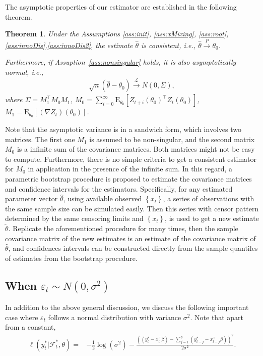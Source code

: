 \documentclass[a4paper,12pt]{article}
\newcommand{\E}{\mathop{\mathbb{E}}}
\def \trans{^\intercal}
\def \inprob {\stackrel{P}{\longrightarrow}}
\def \indist {\stackrel{\mathcal{L}}{\longrightarrow}}
\def \E{\mbox{E}}
\def \F {\mathcal{F}}
\newtheorem{theorem}{Theorem}[section]
\newenvironment{remark}[1][Remark]{\begin{trivlist}
\item[\hskip \labelsep {\bfseries #1}]}{\end{trivlist}}
\begin{document}
    The asymptotic properties of our estimator are established in the following theorem.

\begin{theorem}
Under the Assumptions \ref{ass:init}, \ref{ass:xMixing}, \ref{ass:root},\ref{ass:innoDis},\ref{ass:innoDis2}, the estimate $\hat{\theta}$ is consistent, i.e., $\hat{\theta}\inprob \theta_0$.

Furthermore, if Assuption~\ref{ass:nonsingular} holds, it is also asymptotically normal, i.e.,
\begin{align*}
\sqrt{n}\left( \hat{\theta} - \theta_0 \right)\indist N(0,\Sigma),
\end{align*}
where $\Sigma = M_1\trans M_0 M_1 $, $M_0=\sum_{i=0}^\infty \E_{\theta_0}\left[ Z_{t+i}(\theta_0)\trans Z_t(\theta_0) \right]$, $M_1 = \E_{\theta_0}\left[ (\nabla Z_t)(\theta_0) \right]$.
\label{thm:consistency}
\end{theorem}

\begin{remark}
Note that the asymptotic variance is in a sandwich form, which involves two matrices. The first one $M_1 $ is assumed to be non-singular, and the second matrix $M_0$ is a infinite sum of the covariance matrices. 
Both matrices might not be easy to compute. Furthermore, there is no simple criteria to get a
consistent estimator for $M_0$ in application in the presence of the infinite sum. 
In this regard, a parametric bootstrap procedure is proposed to estimate the covariance matrices and confidence intervals for the estimators. Specifically, for any estimated parameter vector $\hat{\theta}$, using available observed $\left\{ x_t \right\}$, a series of observations with the same sample size can be simulated easily. Then this series with censor pattern determined by the same censoring limits and $\left\{ x_t \right\}$, is used to get a new estimate $\tilde{\theta}$. Replicate the aforementioned procedure for many times, then the sample covariance matrix of the new estimates is an estimate of the covariance matrix of $\hat{\theta}$, and confidences intervals can be constructed directly from the sample quantiles of estimates from the bootstrap procedure.
\end{remark}


    \subsection{When $\varepsilon_t\sim N(0,\sigma^2)$}
    In addition to the above general discussion, we discuss the following important case where $\varepsilon_t$ follows a normal distribution with variance $\sigma^2$. Note that apart from a constant,
    \begin{align*}
	    \ell(y_t^*|\F_t^*,\theta)= &-\frac{1}{2}\log(\sigma^2) 
	    - \frac{
	    \left( (y^*_{t}-x_t\trans \beta) -\sum_{j=1}^p\left(y^*_{t-j}-x_{t-j}\trans\beta \right) \right)^2}{2\sigma^2}.
    \end{align*}
\end{document}
